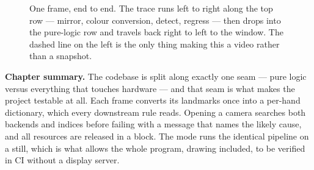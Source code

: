 \begin{figure}[h]
\caption{One frame, end to end. The trace runs left to right along the top row --- mirror, colour
conversion, detect, regress --- then drops into the pure-logic row and travels back right to left to
the window. The dashed line on the left is the only thing making this a video rather than a snapshot.}
\label{fig:pipeline}
\end{figure}

\begin{keyidea}
\textbf{Chapter summary.} The codebase is split along exactly one seam --- pure logic versus
everything that touches hardware --- and that seam is what makes the project testable at all. Each
frame converts its landmarks once into a per-hand dictionary, which every downstream rule reads.
Opening a camera searches both backends and indices before failing with a message that names the
likely cause, and all resources are released in a  block. The  mode runs
the identical pipeline on a still, which is what allows the whole program, drawing included, to be
verified in CI without a display server.
\end{keyidea}

